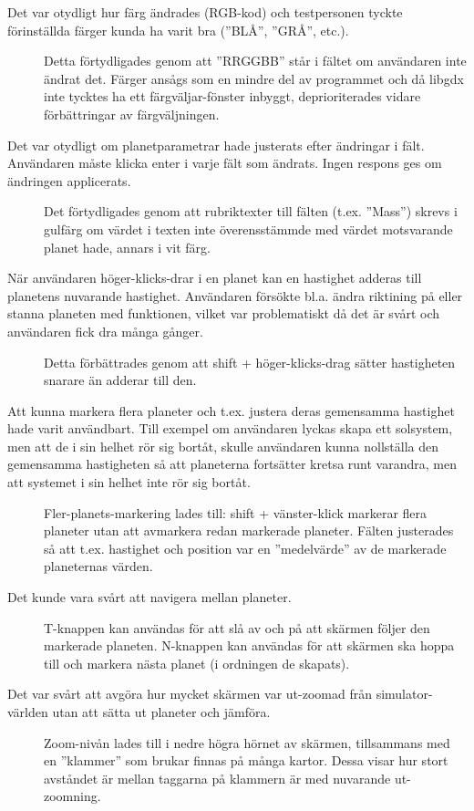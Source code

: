 \begin{description}
    \item[Det var otydligt hur färg ändrades (RGB-kod) och testpersonen
    tyckte förinställda färger kunda ha varit bra (''BLÅ'', ''GRÅ'', etc.).]
    Detta förtydligades genom att ''RRGGBB'' står i fältet om användaren inte
    ändrat det. Färger ansågs som en mindre del av programmet och
    då libgdx inte tycktes ha ett färgväljar-fönster inbyggt, deprioriterades
    vidare förbättringar av färgväljningen.

    \item[Det var otydligt om planetparametrar hade justerats efter ändringar i
    fält. Användaren måste klicka enter i varje fält som ändrats.
    Ingen respons ges om ändringen applicerats.]
    Det förtydligades genom att rubriktexter till fälten (t.ex. ''Mass'')
    skrevs i gulfärg om värdet i texten inte överensstämmde med värdet
    motsvarande planet hade, annars i vit färg.

    \item[När användaren höger-klicks-drar i en planet kan en hastighet
    adderas till planetens nuvarande hastighet.
    Användaren försökte bl.a. ändra riktining på eller stanna planeten
    med funktionen, vilket var problematiskt då det är svårt och
    användaren fick dra många gånger.]
    Detta förbättrades genom att shift + höger-klicks-drag sätter hastigheten
    snarare än adderar till den.

    \item[Att kunna markera flera planeter och t.ex. justera deras gemensamma
    hastighet hade varit användbart. Till exempel om användaren lyckas
    skapa ett solsystem, men att de i sin helhet rör sig bortåt, skulle
    användaren kunna nollställa den gemensamma hastigheten så att planeterna
    fortsätter kretsa runt varandra, men att systemet i sin helhet inte rör
    sig bortåt.]
    Fler-planets-markering lades till: shift + vänster-klick markerar flera
    planeter utan att avmarkera redan markerade planeter.
    Fälten justerades så att t.ex. hastighet och position var en ''medelvärde''
    av de markerade planeternas värden.


    \item[Det kunde vara svårt att navigera mellan planeter.]
    T-knappen kan användas för att slå av och på att skärmen följer
    den markerade planeten. N-knappen kan användas för att skärmen
    ska hoppa till och markera nästa planet (i ordningen de skapats).

    \item[Det var svårt att avgöra hur mycket skärmen var ut-zoomad från
    simulator-världen utan att sätta ut planeter och jämföra.]
    Zoom-nivån lades till i nedre högra hörnet av skärmen, tillsammans
    med en ''klammer'' som brukar finnas på många kartor.
    Dessa visar hur stort avståndet är mellan taggarna på klammern är med
    nuvarande ut-zoomning.


\end{description}

